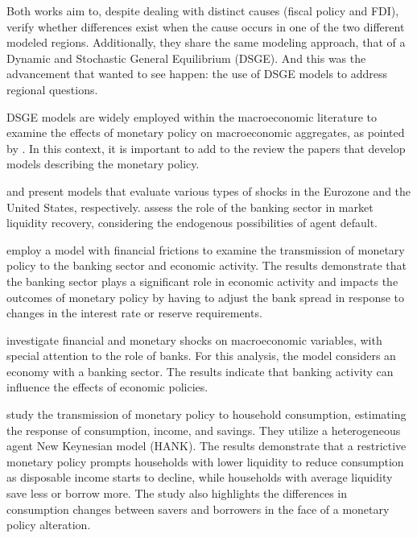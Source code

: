 \documentclass[../thesis.tex]{subfiles}
\begin{document}
Both works aim to, despite dealing with distinct causes (fiscal policy and FDI), verify whether differences exist when the cause occurs in one of the two different modeled regions. Additionally, they share the same modeling approach, that of a Dynamic and Stochastic General Equilibrium (DSGE). And this was the advancement that \textcite{rickman_modern_2010} wanted to see happen: the use of DSGE models to address regional questions.


DSGE models are widely employed within the macroeconomic literature to examine the effects of monetary policy on macroeconomic aggregates, as pointed by \textcite{gali_monetary_2015}. In this context, it is important to add to the review the papers that develop models describing the monetary policy.

\textcite{smets_estimated_2003} and \textcite{smets_shocks_2007} present models that evaluate various types of shocks in the Eurozone and the United States, respectively. \textcite{walque_financial_2010} assess the role of the banking sector in market liquidity recovery, considering the endogenous possibilities of agent default.

\textcite{vinhado_politica_2016} employ a model with financial frictions to examine the transmission of monetary policy to the banking sector and economic activity. The results demonstrate that the banking sector plays a significant role in economic activity and impacts the outcomes of monetary policy by having to adjust the bank spread in response to changes in the interest rate or reserve requirements.

\textcite{soltani_investigating_2021} investigate financial and monetary shocks on macroeconomic variables, with special attention to the role of banks. For this analysis, the model considers an economy with a banking sector. The results indicate that banking activity can influence the effects of economic policies.

\textcite{holm_transmission_2021} study the transmission of monetary policy to household consumption, estimating the response of consumption, income, and savings. They utilize a heterogeneous agent New Keynesian model (HANK). The results demonstrate that a restrictive monetary policy prompts households with lower liquidity to reduce consumption as disposable income starts to decline, while households with average liquidity save less or borrow more. The study also highlights the differences in consumption changes between savers and borrowers in the face of a monetary policy alteration.
\end{document}
